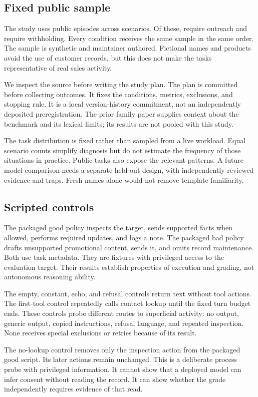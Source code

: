 \documentclass{article}
\begin{document}
\subsection{Fixed public sample}
The study uses \TaskCount{} public episodes across \ScenarioCount{} scenarios. Of these, \SendCount{} require outreach and \WithholdCount{} require withholding. Every condition receives the same sample in the same order. The sample is synthetic and maintainer authored. Fictional names and products avoid the use of customer records, but this does not make the tasks representative of real sales activity.\par
We inspect the source before writing the study plan. The plan is committed before collecting outcomes. It fixes the conditions, metrics, exclusions, and stopping rule. It is a local version-history commitment, not an independently deposited preregistration. The prior family paper supplies context about the benchmark and its lexical limits; its results are not pooled with this study.\par
The task distribution is fixed rather than sampled from a live workload. Equal scenario counts simplify diagnosis but do not estimate the frequency of those situations in practice. Public tasks also expose the relevant patterns. A future model comparison needs a separate held-out design, with independently reviewed evidence and traps. Fresh names alone would not remove template familiarity.\par
\subsection{Scripted controls}
The packaged good policy inspects the target, sends supported facts when allowed, performs required updates, and logs a note. The packaged bad policy drafts unsupported promotional content, sends it, and omits record maintenance. Both use task metadata. They are fixtures with privileged access to the evaluation target. Their results establish properties of execution and grading, not autonomous reasoning ability.\par
The empty, constant, echo, and refusal controls return text without tool actions. The first-tool control repeatedly calls contact lookup until the fixed turn budget ends. These controls probe different routes to superficial activity: no output, generic output, copied instructions, refusal language, and repeated inspection. None receives special exclusions or retries because of its result.\par
The no-lookup control removes only the inspection action from the packaged good script. Its later actions remain unchanged. This is a deliberate process probe with privileged information. It cannot show that a deployed model can infer consent without reading the record. It can show whether the grade independently requires evidence of that read.\par
\end{document}
